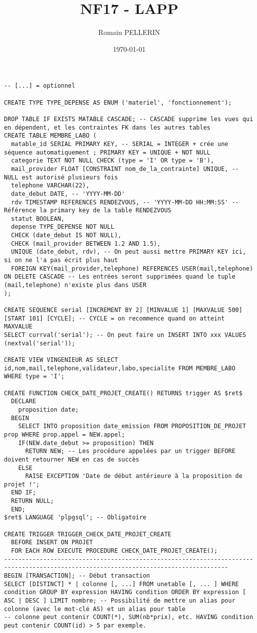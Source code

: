 \documentclass[11pt,a4paper,oneside,french,svgnames]{report}
\title{NF17 - LAPP}
\author{Romain PELLERIN}
\date\today
\newcommand{\code}[2]{\lstset{
  language=#2,
  title={{\setlength{\fboxsep}{1pt}\fcolorbox{orange}{yellow!20}{\sffamily\scriptsize
              \textcolor{gray!10}{\_}{#1}\textcolor{gray!10}{\_}}}}
  }
}
\begin{document}
\scriptsize

\code{SQL (postgresql)}{SQL}
\begin{lstlisting}
-- [...] = optionnel

CREATE TYPE TYPE_DEPENSE AS ENUM ('materiel', 'fonctionnement');

DROP TABLE IF EXISTS MATABLE CASCADE; -- CASCADE supprime les vues qui en dépendent, et les contraintes FK dans les autres tables
CREATE TABLE MEMBRE_LABO (                                                        
  matable_id SERIAL PRIMARY KEY, -- SERIAL = INTEGER + crée une séquence automatiquement ; PRIMARY KEY = UNIQUE + NOT NULL
  categorie TEXT NOT NULL CHECK (type = 'I' OR type = 'B'),
  mail_provider FLOAT [CONSTRAINT nom_de_la_contrainte] UNIQUE, -- NULL est autorisé plusieurs fois
  telephone VARCHAR(22),
  date_debut DATE, -- 'YYYY-MM-DD'
  rdv TIMESTAMP REFERENCES RENDEZVOUS, -- 'YYYY-MM-DD HH:MM:SS' -- Référence la primary key de la table RENDEZVOUS
  statut BOOLEAN,
  depense TYPE_DEPENSE NOT NULL
  CHECK (date_debut IS NOT NULL),
  CHECK (mail_provider BETWEEN 1.2 AND 1.5),
  UNIQUE (date_debut, rdv), -- On peut aussi mettre PRIMARY KEY ici, si on ne l'a pas écrit plus haut
  FOREIGN KEY(mail_provider,telephone) REFERENCES USER(mail,telephone) ON DELETE CASCADE -- Les entrées seront supprimées quand le tuple (mail,telephone) n'existe plus dans USER                     
);

CREATE SEQUENCE serial [INCREMENT BY 2] [MINVALUE 1] [MAXVALUE 500] [START 101] [CYCLE]; -- CYCLE = on recommence quand on atteint MAXVALUE
SELECT currval('serial'); -- On peut faire un INSERT INTO xxx VALUES (nextval('serial'));

CREATE VIEW VINGENIEUR AS SELECT id,nom,mail,telephone,validateur,labo,specialite FROM MEMBRE_LABO WHERE type = 'I';

CREATE FUNCTION CHECK_DATE_PROJET_CREATE() RETURNS trigger AS $ret$
  DECLARE
    proposition date;
  BEGIN
    SELECT INTO proposition date_emission FROM PROPOSITION_DE_PROJET prop WHERE prop.appel = NEW.appel;
    IF(NEW.date_debut >= proposition) THEN
      RETURN NEW; -- Les procédure appelées par un trigger BEFORE doivent retourner NEW en cas de succès
    ELSE
      RAISE EXCEPTION 'Date de début antérieure à la proposition de projet !';
  END IF;
  RETURN NULL;
  END;
$ret$ LANGUAGE 'plpgsql'; -- Obligatoire

CREATE TRIGGER TRIGGER_CHECK_DATE_PROJET_CREATE
  BEFORE INSERT ON PROJET
  FOR EACH ROW EXECUTE PROCEDURE CHECK_DATE_PROJET_CREATE();
-------------------------------------------------------------------------------------------------------------------------------------
BEGIN [TRANSACTION]; -- Début transaction
SELECT [DISTINCT] * | colonne [, ...] FROM unetable [, ... ] WHERE condition GROUP BY expression HAVING condition ORDER BY expression [ ASC | DESC ] LIMIT nombre; -- Possibilité de mettre un alias pour colonne (avec le mot-clé AS) et un alias pour table
-- colonne peut contenir COUNT(*), SUM(nb*prix), etc. HAVING condition peut contenir COUNT(id) > 5 par exemple.


\end{lstlisting}
\end{document}
